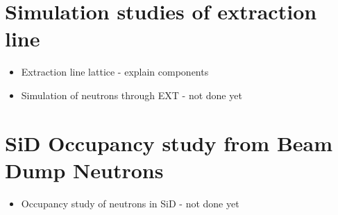 \section{Simulation studies of extraction line}
\label{BeamDumps:sim_EXT}

\begin{itemize}
 \item Extraction line lattice - explain components
 \item Simulation of neutrons through EXT - not done yet
\end{itemize}

\section{SiD Occupancy study from Beam Dump Neutrons}
\label{BeamDumps:SiDocc}

\begin{itemize}
 \item Occupancy study of neutrons in SiD - not done yet
\end{itemize}